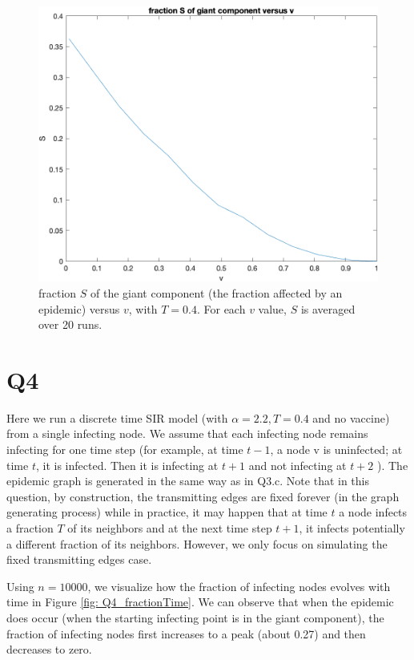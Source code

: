 \documentclass{article}
\begin{document}
\begin{figure}[htp]
	\centering
	\includegraphics[width=.8\linewidth]{figs/Q3_d.png}
	\caption{fraction $ S $ of the giant component (the fraction affected by an epidemic) versus $ v $, with $ T = 0.4 $. For each $ v $ value, $ S $ is averaged over 20 runs.}
	\label{fig: Q3_d}
\end{figure}

\section*{Q4}
Here we run a discrete time SIR model (with $ \alpha=2.2, T = 0.4 $ and no vaccine) from a single infecting node. We assume that each infecting node remains infecting for one time step (for example, at time $ t-1 $, a node v is uninfected; at time $ t $, it is infected. Then it is infecting at $ t+1 $ and not infecting at $ t+2 $ ). The epidemic graph is generated in the same way as in Q3.c. Note that in this question, by construction, the transmitting edges are fixed forever (in the graph generating process) while in practice, it may happen that at time $ t $ a node infects a fraction $ T $ of its neighbors and at the next time step $ t+1 $, it infects potentially a different fraction of its neighbors. However, we only focus on simulating
 the fixed transmitting edges case.
 
Using $ n = 10000$, we visualize how the fraction of infecting nodes evolves with time in Figure \ref{fig: Q4_fractionTime}. We can observe that when the epidemic does occur (when the starting infecting point is in the giant component), the fraction of infecting nodes first increases to a peak (about 0.27) and then decreases to zero.
 
\end{document}
